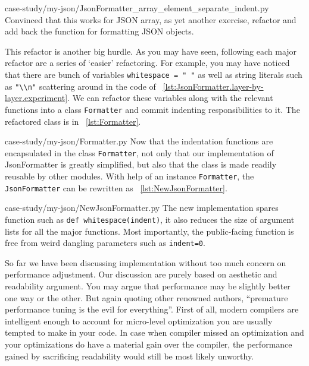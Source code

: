 \documentclass[oneside,11pt]{book}
\theoremstyle{definition}
\theoremstyle{remark}
\newcommand{\code}[1]{\mbox{\lstinline{#1}}}
\begin{document}

{case-study/my-json/JsonFormatter_array_element_separate_indent.py}
Convinced that this works for JSON array, as yet another exercise, refactor and add back the
function for formatting JSON objects.

This refactor is another big hurdle.
As you may have seen, following each major refactor are a series of `easier' refactoring.
For example, you may have noticed that there are bunch of variables \code{whitespace = " "} as
well as string literals such as \code{"\\n"} scattering around in the code of
~\autoref{lst:JsonFormatter.layer-by-layer.experiment}.
We can refactor these variables along with the relevant functions into a class
\code{Formatter} and commit indenting responsibilities to it.
The refactored class is in ~\autoref{lst:Formatter}.

{case-study/my-json/Formatter.py}
Now that the indentation functions are encapsulated
in the class \code{Formatter}, not only that our implementation of JsonFormatter is greatly
simplified, but also that the class is made readily reusable by other modules.
With help of an instance \code{Formatter}, the \code{JsonFormatter} can be rewritten as
~\autoref{lst:NewJsonFormatter}.

{case-study/my-json/NewJsonFormatter.py}
The new implementation spares function such as \code{def whitespace(indent)}, it also reduces the
size of argument lists for all the major functions.
Most importantly, the public-facing function is free from weird dangling parameters such as
\code{indent=0}.

So far we have been discussing implementation without too much concern on performance adjustment.
Our discussion are purely based on aesthetic and readability argument.
You may argue that performance may be slightly better one way or the other.
But again quoting other renowned authors, ``premature performance tuning is the evil for
everything''.
First of all, modern compilers are intelligent enough to account for micro-level optimization
you are usually tempted to make in your code.
In case when compiler missed an optimization and
your optimizations do have a material gain over the compiler,
the performance gained by sacrificing readability would still be most likely unworthy.
\end{document}
